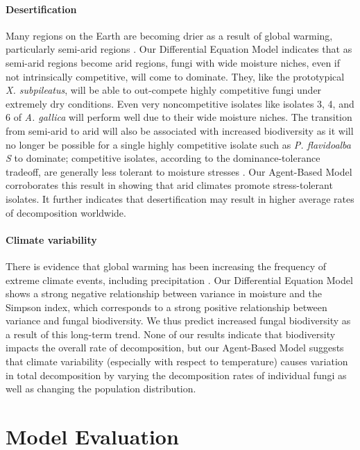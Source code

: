 \documentclass[12pt]{article}
\begin{document}
\paragraph{Desertification}
Many regions on the Earth are becoming drier as a result of global warming, particularly semi-arid regions \cite{desertification}. Our Differential Equation Model indicates that as semi-arid regions become arid regions, fungi with wide moisture niches, even if not intrinsically competitive, will come to dominate. They, like the prototypical \emph{X. subpileatus}, will be able to out-compete highly competitive fungi under extremely dry conditions. Even very noncompetitive isolates like isolates 3, 4, and 6 of \emph{A. gallica} will perform well due to their wide moisture niches. The transition from semi-arid to arid will also be associated with increased biodiversity as it will no longer be possible for a single highly competitive isolate such as \emph{P. flavidoalba S} to dominate; competitive isolates, according to the dominance-tolerance tradeoff, are generally less tolerant to moisture stresses \cite{trait-based}. Our Agent-Based Model corroborates this result in showing that arid climates promote stress-tolerant isolates. It further indicates that desertification may result in higher average rates of decomposition worldwide.

\paragraph{Climate variability}
There is evidence that global warming has been increasing the frequency of extreme climate events, including precipitation \cite{ipcc}. Our Differential Equation Model shows a strong negative relationship between variance in moisture and the Simpson index, which corresponds to a strong positive relationship between variance and fungal biodiversity. We thus predict increased fungal biodiversity as a result of this long-term trend. None of our results indicate that biodiversity impacts the overall rate of decomposition, but our Agent-Based Model suggests that climate variability (especially with respect to temperature) causes variation in total decomposition by varying the decomposition rates of individual fungi as well as changing the population distribution.

\section{Model Evaluation}
\end{document}
